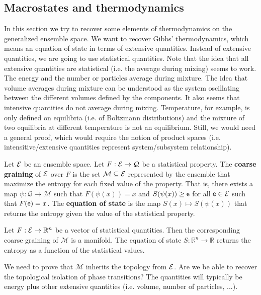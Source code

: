 \subsection{Macrostates and thermodynamics}

In this section we try to recover some elements of thermodynamics on the generalized ensemble space. We want to recover Gibbs' thermodynamics, which means an equation of state in terms of extensive quantities. Instead of extensive quantities, we are going to use statistical quantities. Note that the idea that all extensive quantities are statistical (i.e. the average during mixing) seems to work. The energy and the number or particles average during mixture. The idea that volume averages during mixture can be understood as the system oscillating between the different volumes defined by the components. It also seems that intensive quantities do not average during mixing. Temperature, for example, is only defined on equilibria (i.e. of Boltzmann distributions) and the mixture of two equilibria at different temperature is not an equilibrium. Still, we would need a general proof, which would require the notion of product spaces (i.e. intensitive/extensive quantities represent system/subsystem relationship).

\begin{defn}
	Let $\mathcal{E}$ be an ensemble space. Let $F : \mathcal{E} \to \mathcal{Q}$ be a statistical property. The \textbf{coarse graining} of $\mathcal{E}$ over $F$ is the set $\mathcal{M} \subseteq \mathcal{E}$ represented by the ensemble that maximize the entropy for each fixed value of the property. That is, there exists a map $\psi : \mathcal{Q} \to \mathcal{M}$ such that $F(\psi(x)) = x$ and $S(\psi(x)) \geq \mathsf{e}$ for all $\mathsf{e} \in \mathcal{E}$ such that $F(\mathsf{e}) = x$. The \textbf{equation of state} is the map $S(x) \mapsto S(\psi(x))$ that returns the entropy given the value of the statistical property.
\end{defn}

\begin{conj}
	Let $F : \mathcal{E} \to \mathbb{R}^n$ be a vector of statistical quantities. Then the corresponding coarse graining of $\mathcal{M}$ is a manifold. The equation of state $S : \mathbb{R}^n \to \mathbb{R}$ returns the entropy as a function of the statistical values.
\end{conj}

\begin{remark}
	We need to prove that $\mathcal{M}$ inherits the topology from $\mathcal{E}$. Are we be able to recover the topological isolation of phase transitions? The quantities will typically be energy plus other extensive quantities (i.e. volume, number of particles, ...).
\end{remark}

